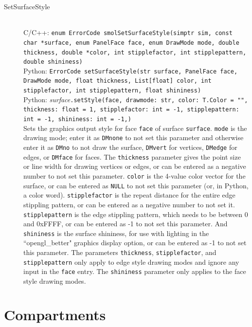 \documentclass {book}
\newcommand {\ttt} {\texttt}
\begin{document}
\begin{description}
\item[SetSurfaceStyle]
\hfill \\
C/C++: \ttt{enum ErrorCode smolSetSurfaceStyle(simptr sim, const char *surface, enum PanelFace face, enum DrawMode mode, double thickness, double *color, int stipplefactor, int stipplepattern, double shininess)}\\
Python: \ttt{ErrorCode setSurfaceStyle(str surface, PanelFace face, DrawMode mode, float thickness, List[float] color, int stipplefactor, int stipplepattern, float shininess)}\\
Python: \textit{surface}\ttt{.setStyle(face, drawmode: str, color: T.Color = "", thickness: float = 1, stipplefactor: int = -1, stipplepattern: int = -1, shininess: int = -1,)}\\
Sets the graphics output style for face \ttt{face} of surface \ttt{surface}. \ttt{mode} is the drawing mode; enter it as \ttt{DMnone} to not set this parameter and otherwise enter it as \ttt{DMno} to not draw the surface, \ttt{DMvert} for vertices, \ttt{DMedge} for edges, or \ttt{DMface} for faces. The \ttt{thickness} parameter gives the point size or line width for drawing vertices or edges, or can be entered as a negative number to not set this parameter. \ttt{color} is the 4-value color vector for the surface, or can be entered as \ttt{NULL} to not set this parameter (or, in Python, a color word). \ttt{stipplefactor} is the repeat distance for the entire edge stippling pattern, or can be entered as a negative number to not set it. \ttt{stipplepattern} is the edge stippling pattern, which needs to be between 0 and 0xFFFF, or can be entered as -1 to not set this parameter. And \ttt{shininess} is the surface shininess, for use with lighting in the ``opengl\_better" graphics display option, or can be entered as -1 to not set this parameter. The parameters \ttt{thickness}, \ttt{stipplefactor}, and \ttt{stipplepattern} only apply to edge style drawing modes and ignore any input in the \ttt{face} entry. The \ttt{shininess} parameter only applies to the face style drawing modes.

\end{description}

\section{Compartments}
\end{document}
